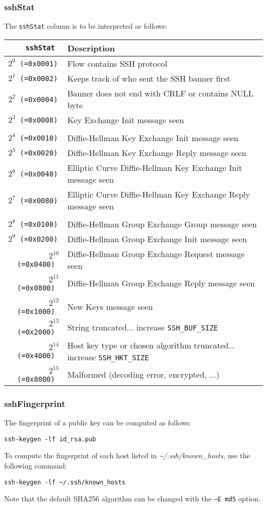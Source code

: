 \documentclass[documentation]{subfiles}
\begin{document}
\subsubsection{sshStat}\label{sshStat}
The {\tt sshStat} column is to be interpreted as follows:
\begin{longtable}{>{\tt}rl}
    \toprule
    {\bf sshStat} & {\bf Description}\\
    \midrule\endhead%
    $2^{0}$  (=0x0001) & Flow contains SSH protocol\\
    $2^{1}$  (=0x0002) & Keeps track of who sent the SSH banner first\\
    $2^{2}$  (=0x0004) & Banner does not end with CRLF or contains NULL byte\\
    $2^{3}$  (=0x0008) & Key Exchange Init message seen\\
    \\
    $2^{4}$  (=0x0010) & Diffie-Hellman Key Exchange Init message seen\\
    $2^{5}$  (=0x0020) & Diffie-Hellman Key Exchange Reply message seen\\
    $2^{6}$  (=0x0040) & Elliptic Curve Diffie-Hellman Key Exchange Init message seen\\
    $2^{7}$  (=0x0080) & Elliptic Curve Diffie-Hellman Key Exchange Reply message seen\\
    \\
    $2^{8}$  (=0x0100) & Diffie-Hellman Group Exchange Group message seen\\
    $2^{9}$  (=0x0200) & Diffie-Hellman Group Exchange Init message seen\\
    $2^{10}$ (=0x0400) & Diffie-Hellman Group Exchange Request message seen\\
    $2^{11}$ (=0x0800) & Diffie-Hellman Group Exchange Reply message seen\\
    \\
    $2^{12}$ (=0x1000) & New Keys message seen\\
    $2^{13}$ (=0x2000) & String truncated... increase {\tt SSH\_BUF\_SIZE}\\
    $2^{14}$ (=0x4000) & Host key type or chosen algorithm truncated... increase {\tt SSH\_HKT\_SIZE}\\
    $2^{15}$ (=0x8000) & Malformed (decoding error, encrypted, ...)\\
    \bottomrule
\end{longtable}

\subsubsection{sshFingerprint}\label{sshFingerprint}
The fingerprint of a public key can be computed as follows:
\begin{center}
    {\tt ssh-keygen -lf id\_rsa.pub}
\end{center}
To compute the fingerprint of each host listed in {\em \textasciitilde{}/.ssh/known\_hosts}, use the following command:
\begin{center}
    {\tt ssh-keygen -lf \textasciitilde{}/.ssh/known\_hosts}
\end{center}
Note that the default SHA256 algorithm can be changed with the {\tt --E md5} option.
\end{document}
